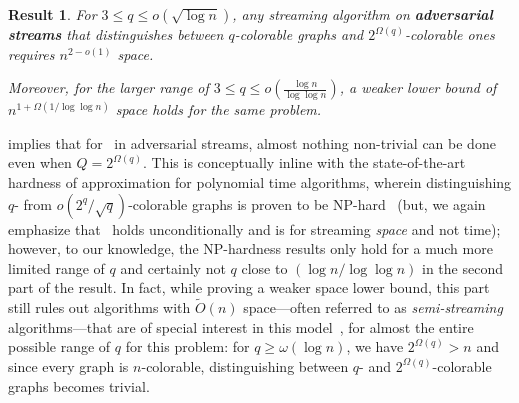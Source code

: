 \documentclass[11pt]{article}
\newtheorem{mdresult}{Result}
\newenvironment{result}{\begin{mdframed}[backgroundcolor=lightgray!40,topline=false,rightline=false,leftline=false,bottomline=false,innertopmargin=5pt]\begin{mdresult}}{\end{mdresult}\end{mdframed}}
\theoremstyle{definition}
\renewcommand{\leq}{\leqslant}
\renewcommand{\geq}{\geqslant}
\newcommand{\Ot}{\ensuremath{\widetilde{O}}}
\newcommand{\paren}[1]{\ensuremath{\left(#1\right)}\xspace}
\begin{document}
\begin{result}\label{res:adv}
	For $3 \leq q \leq o(\sqrt{\log{n}})$, any streaming algorithm on \textbf{adversarial streams} that distinguishes between $q$-colorable graphs and $2^{\Omega(q)}$-colorable ones requires $n^{2-o(1)}$ space. 
	
	Moreover, for the larger range of $3 \leq q \leq o(\frac{\log{n}}{\log\log{n}})$, 
	a weaker lower bound of $n^{1+\Omega(1/\log\log{n})}$ space holds for the same problem. 
\end{result}

 implies that for~ in adversarial streams, almost nothing non-trivial can be done even when $Q = 2^{\Omega(q)}$. 
This is conceptually inline with the state-of-the-art hardness of approximation for polynomial time algorithms, wherein distinguishing $q$- from $o(2^{q}/\sqrt{q})$-colorable graphs is proven to be NP-hard~\cite{KrokhinOWZ23} (but, we again emphasize that~ holds unconditionally and is for streaming \emph{space} and not time); however, to our knowledge, the NP-hardness results only
hold for a much more limited range of $q$ and certainly not $q$ close to $(\log{n}/\log\log{n})$ in the second part of the result. In fact, while proving a weaker space lower bound, this part still rules out algorithms with $\Ot(n)$ space---often referred to as \emph{semi-streaming} 
algorithms---that are of special interest in this model~\cite{FeigenbaumKMSZ04}, for almost the entire possible range of $q$ for this problem: for $q \geq \omega(\log{n})$, we have $2^{\Omega(q)} > n$ 
and since every graph is $n$-colorable, distinguishing between $q$- and $2^{\Omega(q)}$-colorable graphs becomes trivial. 


\end{document}
